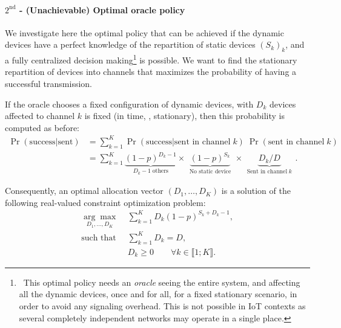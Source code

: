 \paragraph{$2^{\text{nd}}$ - (Unachievable) Optimal oracle policy}

We investigate here the optimal policy that can be achieved if the dynamic devices have a perfect knowledge of the repartition of static devices $(S_k)_k$, and a fully centralized decision making\footnote{~This optimal policy needs an \emph{oracle} seeing the entire system, and affecting all the dynamic devices, once and for all, for a fixed stationary scenario, in order to avoid any signaling overhead. This is not possible in IoT contexts as several completely independent networks may operate in a single place.} is possible.
We want to find the stationary repartition of devices into channels that maximizes the probability of having a successful transmission.

If the oracle chooses a fixed configuration of dynamic devices, with $D_k$ devices affected to channel $k$ is fixed (in time, \ie, stationary),
then this probability is computed as before:
\begin{align}\label{eq:41:prob_col}
    \Pr(\text{success}|\text{sent})
    & = \sum_{k=1}^{K} \Pr(\text{success}|\text{sent in channel}\;k) \; \Pr(\text{sent in channel}\;k) \nonumber \\
    & = \sum_{k=1}^{K} \underbrace{(1 - p)^{D_k - 1}}_{\;\;D_k - 1 \;\text{others}\;\;} \times \underbrace{(1 - p)^{S_k}}_{\;\;\text{No static device}\;\;} \times \underbrace{ D_k / D }_{\;\;\text{Sent in channel}\; k\;\;}.
\end{align}

Consequently, an optimal allocation vector $(D_1,\dots,D_{K})$ is a solution of the following real-valued constraint optimization problem:
%
\begin{subequations}\label{eq:41:prob}
\begin{align}
    \underset{D_1,\dots,D_{K}}{\arg\max}\; & \sum_{k=1}^{K} D_k (1 - p)^{S_k + D_k -1}, \label{eq:41:optPb}\\
    \text{such that}\;\; & \sum_{k=1}^{K} D_k = D, \label{eq:41:eqCstr}\\
    & D_k \geq 0 \qquad \forall k\in\llbracket 1;K\rrbracket . \label{eq:41:ineqCstr}
\end{align}
\end{subequations}

